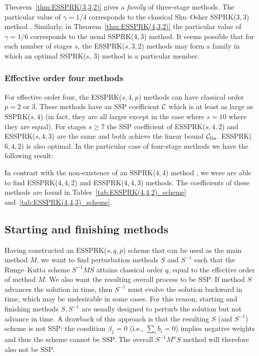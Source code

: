 Theorem~\ref{thm:ESSPRK(3,3,2)} gives a \emph{family} of three-stage methods. 
The particular value of $\gamma = 1/4$ corresponds to the classical Shu--Osher 
SSPRK($3,3$) method \cite{Gottlieb1998}.
Similarly, in Theorem~\ref{thm:ESSPRK(4,3,2)} the particular value of $\gamma = 1/6$ 
corresponds to the usual SSPRK($4,3$) method.
It seems possible that for each number of stages $s$, the ESSPRK($s, 3, 2$) methods may 
form a family in which an optimal SSPRK($s$, $3$) method is a particular member. 

\subsubsection{Effective order four methods}\label{subsubsec:4th_ESSPRK}
For effective order four, the ESSPRK($s,4,p$) methods can have
classical order $p=2$ or $3$.
These methods have an SSP coefficient $\mathcal{C}$ which is at least as
large as SSPRK($s, 4$) (in fact, they are all larger except in the
case where $s =10$ where they are equal).
For stages $s \ge 7$ the SSP coefficient of ESSPRK($s,4,2$) and
ESSPRK($s,4,3$) are the same and both achieve the linear bound
$\mathcal{C}_{\text{lin}}$.
ESSPRK($6,4,2$) is also optimal.
In the particular case of four-stage methods we have the following result:
\begin{result}
	In contrast with the non-existence of an SSPRK(4,\,4) method \cite{Gottlieb1998,Ruuth2002}, 
	we were are able to find ESSPRK(4,\,4,\,2) and ESSPRK(4,\,4,\,3) methods.
	The coefficients of these methods are found in
	Tables~\ref{tab:ESSPRK(4,4,2)_scheme}
	and~\ref{tab:ESSPRK(4,4,3)_scheme}.
\end{result}


\subsection{Starting and finishing methods}\label{subsec:starting_finishing}
Having constructed an ESSPRK($s,q,p$) scheme that can be used as the main method $M$, we 
want to find perturbation methods $S$ and $S^{-1}$ such that the Runge--Kutta scheme 
$S^{-1}MS$ attains classical order $q$, equal to the effective order of method $M$.
We also want the resulting overall process to be SSP.
If method $S$ advances the solution in time, then $S^{-1}$ must evolve the solution 
backward in time, which may be undesirable in some cases. 
For this reason, starting and finishing methods $S, S^{-1}$ are usually designed to perturb
the solution but not advance in time. 
A drawback of this approach is that the resulting $S$ (and $S^{-1}$) scheme is not
SSP:
the condition $\beta_1 = 0$ (i.e., $\sum_i b_i = 0$) implies negative
weights and thus the scheme cannot be SSP.
The overall $S^{-1}M^nS$ method will therefore also not be SSP.


